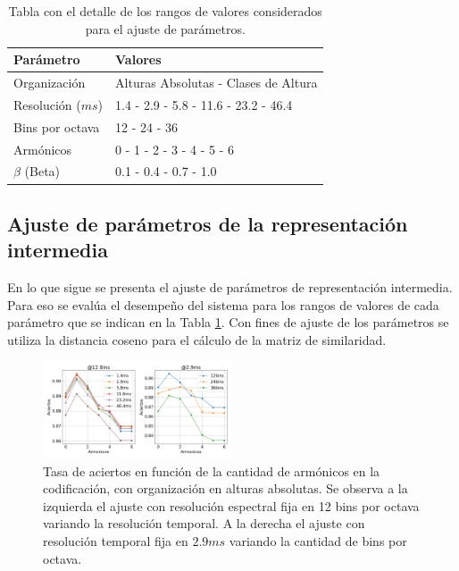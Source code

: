 \documentclass
  [ams,pdfout]%
	{aeslac}
\begin{document}
\begin{table}[!ht]
\caption{Tabla con el detalle de los rangos de valores considerados para el ajuste de parámetros.}
\label{tab:parametros}
\vspace*{10pt}
\centering
\small
\begin{tabular}{ll}
\textbf{Parámetro}	&	\textbf{Valores}\\ \hline
Organización           & Alturas Absolutas - Clases de Altura        \\ 
Resolución ($ms$) & 1.4 - 2.9 - 5.8 - 11.6 - 23.2 - 46.4        \\ 
Bins por octava                       & 12 - 24 - 36                                \\ 
Armónicos                             & 0 - 1 - 2 - 3 - 4 - 5 - 6                   \\ 
$\beta$ (Beta)                        & 0.1 - 0.4 - 0.7 - 1.0  \\ 
\end{tabular}
\end{table}

\subsection{Ajuste de parámetros de la representación intermedia}
En lo que sigue se presenta el ajuste de parámetros de representación intermedia. Para eso se evalúa el desempeño del sistema para los rangos de valores de cada parámetro que se indican en la Tabla \ref{tab:parametros}. Con fines de ajuste de los parámetros se utiliza la distancia coseno para el cálculo de la matriz de similaridad. 

\begin{figure}[h!] 
\begin{center}
\includegraphics[width=0.5\textwidth]{imagenes/aciertos_cqt} 
\caption{Tasa de aciertos en función de la cantidad de armónicos en la codificación, con organización en alturas absolutas. Se observa a la izquierda el ajuste con resolución espectral fija en 12 bins por octava variando la resolución temporal. A la derecha el ajuste con resolución temporal fija en $2.9ms$ variando la cantidad de bins por octava. }
\label{fig:aciertos_cqt}
\end{center}
\end{figure} 
\end{document}
